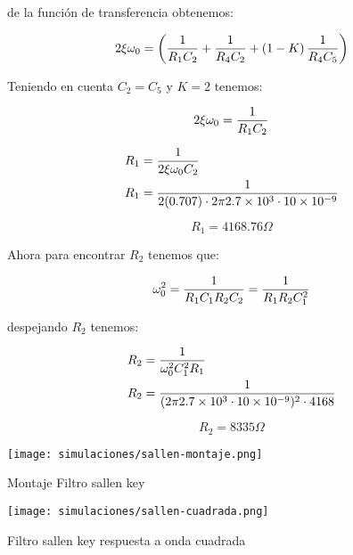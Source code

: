 de la función de transferencia obtenemos:

\begin{equation}
    2\xi \omega_0 = \left(\frac{1}{R_1 C_2} + \frac{1}{R_4 C_2} + \left(1 - K\right) \frac{1}{R_4 C_5}\right)
\end{equation}

Teniendo en cuenta $C_2 = C_5$ y $K=2$ tenemos:

\begin{equation}
    2\xi \omega_0 = \frac{1}{R_1 C_2}
\end{equation}

\begin{align*}
    R_1 &= \frac{1}{2\xi \omega_0 C_2} \\
    R_1 &= \frac{1}{2 (0.707) \cdot 2\pi 2.7\times 10^3 \cdot 10\times 10 ^{-9}}
\end{align*}

\begin{equation*}
    R_1 = 4168.76 \Omega
\end{equation*}

Ahora para encontrar $R_2$ tenemos que:

\begin{equation}
    \omega_0^2 = \frac{1}{R_1 C_1 R_2 C_2} = \frac{1}{R_1 R_2 C_1^2}
\end{equation}

despejando $R_2$ tenemos:

\begin{align*}
    R_2 &= \frac{1}{\omega_0^2 C_1^2 R_1} \\
    R_2 &= \frac{1}{(2\pi 2.7\times 10^3 \cdot 10\times 10^{-9})^2 \cdot 4168} \\
\end{align*}

\begin{equation*}
    \boxed{R_2 = 8335 \Omega}
\end{equation*}

\begin{ilustracion}[ht]
    \centering
    \texttt{[image: simulaciones/sallen-montaje.png]}
    \caption{Montaje Filtro sallen key}\label{ilus:sim-sallen-montaje} 
\end{ilustracion}

\begin{ilustracion}[ht]
    \centering
    \texttt{[image: simulaciones/sallen-cuadrada.png]}
    \caption{Filtro sallen key respuesta a onda cuadrada  }
    \label{ilus:sim-sallen-cuadrada} 
\end{ilustracion}

